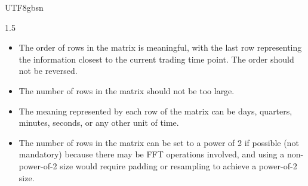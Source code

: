 \documentclass{article}
\begin{document}
\begin{CJK}{UTF8}{gbsn}
\begin{spacing}{1.5}
\begin{itemize}
\item[*] The order of rows in the matrix is meaningful, with the last row representing the information closest to the current trading time point. The order should not be reversed.
\item[*] The number of rows in the matrix should not be too large.
\item[*] The meaning represented by each row of the matrix can be days, quarters, minutes, seconds, or any other unit of time.
\item[*] The number of rows in the matrix can be set to a power of 2 if possible (not mandatory) because there may be FFT operations involved, and using a non-power-of-2 size would require padding or resampling to achieve a power-of-2 size.
\end{itemize}



\end{spacing}
\end{CJK}
\end{document}
